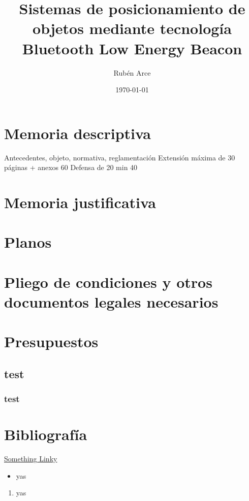 \documentclass[a4paper ,12pt, onecolumn]{article}
\begin{document}
\title{Sistemas de posicionamiento de objetos mediante tecnología Bluetooth Low Energy
Beacon }
\author{Rubén Arce}
\date{\today}
\maketitle
\tableofcontents
\section{Memoria descriptiva}
Antecedentes, objeto, normativa, reglamentación
Extensión máxima de 30 páginas + anexos 60
Defensa de 20 min  40
\section{Memoria justificativa}
\section{Planos}
\section{Pliego de condiciones y otros documentos legales necesarios}
\section{Presupuestos}
\subsection{test}
\subsubsection{test}


\section{Bibliografía}
\href{https://campus.masterd.es/campusvirtual/index.htm}{Something Linky} 
\begin{itemize}
    \item  yas
\end{itemize}
\begin{enumerate}
    \item  yas
\end{enumerate}
\end{document}
